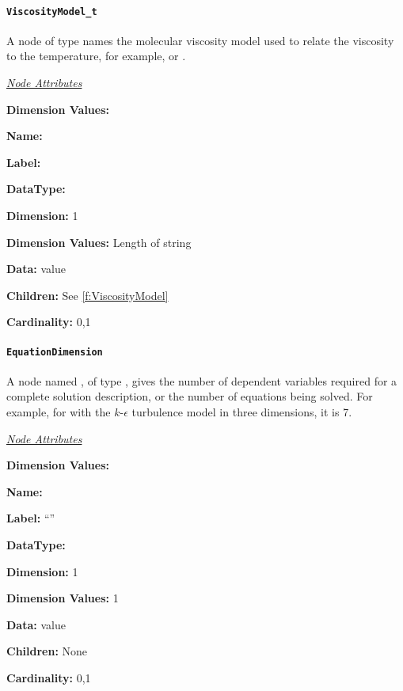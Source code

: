 \paragraph{\texttt{ViscosityModel\_t}}

A node of type  names the molecular viscosity
model used to relate the viscosity to the temperature, for example,
 or .

\textit{\uline{Node Attributes}}
\begin{Ventryic}{\textbf{Dimension Values:}}
\item [\textbf{Name:}]
\item [\textbf{Label:}]
\item [\textbf{DataType:}]
\item [\textbf{Dimension:}]
      1
\item [\textbf{Dimension Values:}]
      Length of string
\item [\textbf{Data:}]
       value
\item [\textbf{Children:}]
      See \autoref{f:ViscosityModel}
\item [\textbf{Cardinality:}]
      0,1
\end{Ventryic}

\paragraph{\texttt{EquationDimension}}

A node named , of type , gives the
number of dependent variables required for a complete solution
description, or the number of equations being solved. For example, for
 with the $k$-$\epsilon$ turbulence model in three
dimensions, it is 7.

\textit{\uline{Node Attributes}}
\begin{Ventryic}{\textbf{Dimension Values:}}
\item [\textbf{Name:}]
\item [\textbf{Label:}]
      ``''
\item [\textbf{DataType:}]
\item [\textbf{Dimension:}]
      1
\item [\textbf{Dimension Values:}]
      1
\item [\textbf{Data:}]
       value
\item [\textbf{Children:}]
      None
\item [\textbf{Cardinality:}]
      0,1
\end{Ventryic}

